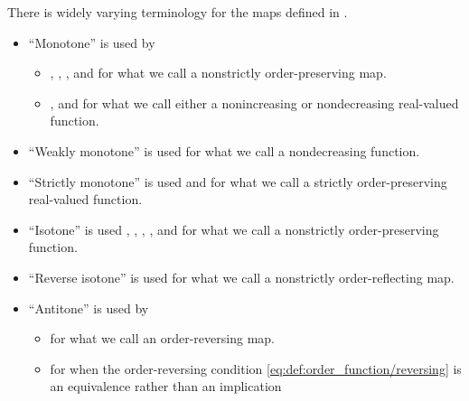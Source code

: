 \begin{remark}\label{rem:order_homomorphism_terminology}
  There is widely varying terminology for the maps defined in .

  \begin{itemize}
    \item \enquote{Monotone} is used by
    \begin{itemize}
      \item {}, , ,  and  for what we call a nonstrictly order-preserving map.

      \item {},  and  for what we call either a nonincreasing or nondecreasing real-valued function.
    \end{itemize}

    \item \enquote{Weakly monotone} is used  for what we call a nondecreasing function.

    \item \enquote{Strictly monotone} is used  and  for what we call a strictly order-preserving real-valued function.

    \item \enquote{Isotone} is used , , , ,  and  for what we call a nonstrictly order-preserving function.

    \item \enquote{Reverse isotone} is used  for what we call a nonstrictly order-reflecting map.

    \item \enquote{Antitone} is used by
    \begin{itemize}
      \item {} for what we call an order-reversing map.
      \item {} for when the order-reversing condition \eqref{eq:def:order_function/reversing} is an equivalence rather than an implication
    \end{itemize}


\end{itemize}
\end{remark}
